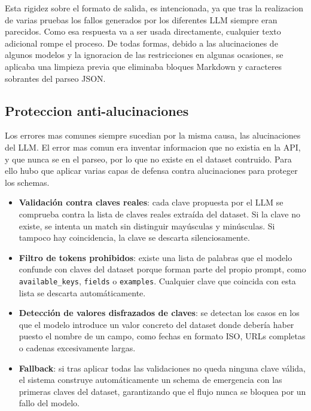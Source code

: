 Esta rigidez sobre el formato de salida, es intencionada, ya que tras la realizacion de varias pruebas los fallos generados por los diferentes LLM siempre eran parecidos.
Como esa respuesta va a ser usada directamente, cualquier texto adicional rompe el proceso. De todas formas, debido a las alucinaciones de algunos modelos y la ignoracion 
de las restricciones en algunas ocasiones, se aplicaba una limpieza previa que eliminaba bloques Markdown y caracteres sobrantes del parseo JSON.


\subsection{Proteccion anti-alucinaciones}
\label{subsec:proteccion-anti-alucionaciones}

Los errores mas comunes siempre sucedian por la misma causa, las alucinaciones del LLM. El error mas comun era inventar informacion que no existia en la API, y que nunca se
en el parseo, por lo que no existe en el dataset contruido. Para ello hubo que aplicar varias capas de defensa contra alucinaciones para proteger los schemas.

\begin{itemize}
    \item \textbf{Validación contra claves reales}: cada clave propuesta por el LLM se comprueba contra la lista de claves reales extraída del dataset. Si la clave no existe, se intenta un match sin distinguir mayúsculas y minúsculas. Si tampoco hay coincidencia, la clave se descarta silenciosamente.
    \item \textbf{Filtro de tokens prohibidos}: existe una lista de palabras que el modelo confunde con claves del dataset porque forman parte del propio prompt, como \texttt{available\_keys}, \texttt{fields} o \texttt{examples}. Cualquier clave que coincida con esta lista se descarta automáticamente.
    \item \textbf{Detección de valores disfrazados de claves}: se detectan los casos en los que el modelo introduce un valor concreto del dataset donde debería haber puesto el nombre de un campo, como fechas en formato ISO, URLs completas o cadenas excesivamente largas.
    \item \textbf{Fallback}: si tras aplicar todas las validaciones no queda ninguna clave válida, el sistema construye automáticamente un schema de emergencia con las primeras claves del dataset, garantizando que el flujo nunca se bloquea por un fallo del modelo.
\end{itemize}

